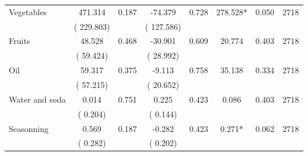 \begin{tabular}{l*{7}{c}}
 Vegetables       &            471.314       &        0.187  &            -74.379       &        0.728  &            278.528*       &              0.050 &  2718 \\ 
                       &       (     229.803)             &                               &       (     127.586)                     &                               &                                               &                                &                      \\ 

 Fruits       &             48.528       &        0.468  &            -30.901       &        0.609  &             20.774       &              0.403 &  2718 \\ 
                       &       (      59.424)             &                               &       (      28.992)                     &                               &                                               &                                &                      \\ 

 Oil       &             59.317       &        0.375  &             -9.113       &        0.758  &             35.138       &              0.334 &  2718 \\ 
                       &       (      57.215)             &                               &       (      20.652)                     &                               &                                               &                                &                      \\ 

 Water and soda       &              0.014       &        0.751  &              0.225       &        0.423  &              0.086       &              0.403 &  2718 \\ 
                       &       (       0.204)             &                               &       (       0.144)                     &                               &                                               &                                &                      \\ 

 Seasonning       &              0.569       &        0.187  &             -0.282       &        0.423  &              0.271*       &              0.062 &  2718 \\ 
                       &       (       0.282)             &                               &       (       0.202)                     &                               &                                               &                                &                      \\ 


\end{tabular}
